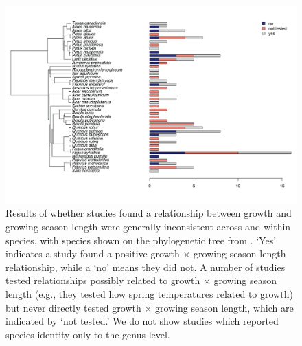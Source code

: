 \documentclass[11pt]{article}
\begin{document}
\clearpage
\begin{figure}[h!]
\includegraphics[width=1\textwidth]{..//figures/speciesnumsphylo/phylosppcountsadj.png}  %
\caption{Results of whether studies found a relationship between growth and growing season length were generally inconsistent across and within species, with species shown on the phylogenetic tree from \citet{smith2018constructing}. `Yes' indicates a study found a positive growth $\times$ growing season length relationship, while a `no' means they did not. A number of studies tested relationships possibly related to growth $\times$ growing season length (e.g., they tested how spring temperatures related to growth) but never directly tested growth $\times$ growing season length, which are indicated by `not tested.' We do not show studies which reported species identity only to the genus level.}
\label{fig:sppfinds}
\end{figure}
\end{document}
